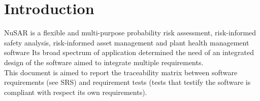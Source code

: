 \section{Introduction}
NuSAR is a flexible and multi-purpose probability risk assessment, risk-informed safety analysis, risk-informed asset
management and plant health management software
Its broad spectrum of application determined the need of an integrated design
of the software aimed to integrate multiple requirements.
\\This document is aimed to report the traceability matrix between software requirements
(see SRS) and requirement tests (tests that testify the software is compliant
with respect its own requirements).

